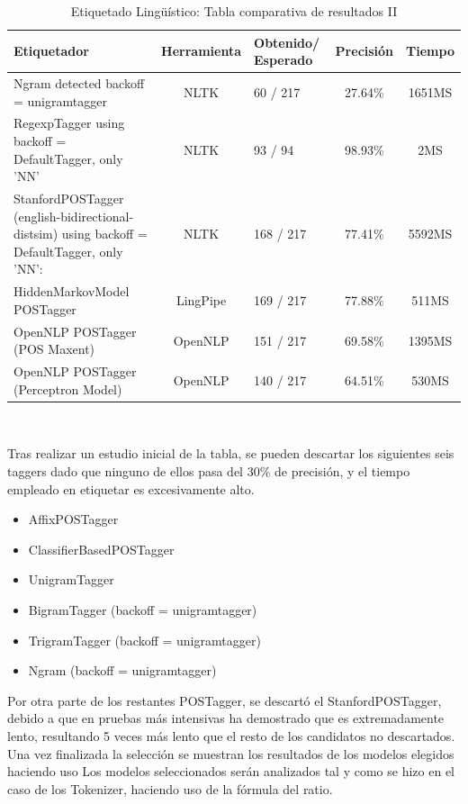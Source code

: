 \documentclass[runningheads,a4paper]{llncs}
\theoremstyle{break}
\newcommand{\rowstyle}[1]{\gdef\currentrowstyle{#1}%
  #1\ignorespaces
}
\begin{document}
\bgroup
\setlength{\tabcolsep}{10pt}
\def\arraystretch{1.5}
\begin{table}
\begin{tabular}{p{4cm}|c|p{2.5cm}|c|c}
\rowstyle{\bfseries} Etiquetador &  \rowstyle{\bfseries} Herramienta & \rowstyle{\bfseries} Obtenido/ \newline Esperado & \rowstyle{\bfseries} Precisión & \rowstyle{\bfseries} Tiempo\\ \hline
Ngram detected backoff = unigramtagger & NLTK & 60 / 217 & 27.64\% & 1651MS \\
RegexpTagger using backoff = DefaultTagger, only 'NN'  & NLTK & 93 / 94 & 98.93\% & 2MS \\
StanfordPOSTagger (english-bidirectional-distsim) using backoff = DefaultTagger, only 'NN': & NLTK & 168 / 217 & 77.41\% & 5592MS \\
HiddenMarkovModel POSTagger          & LingPipe & 169 / 217 & 77.88\% & 511MS \\
OpenNLP POSTagger (POS Maxent)       & OpenNLP  & 151 / 217 & 69.58\% & 1395MS \\
OpenNLP POSTagger (Perceptron Model) & OpenNLP  & 140 / 217 & 64.51\% & 530MS \\ \hline
\end{tabular}
\textbf{}\\
\caption{Etiquetado Lingüístico: Tabla comparativa de resultados II}
\end{table}
\egroup


Tras realizar un estudio inicial de la tabla, se pueden descartar los siguientes seis taggers dado que ninguno de ellos pasa del 30\% de precisión, y el tiempo empleado en etiquetar es excesivamente alto. 

\begin{itemize}
  \item AffixPOSTagger
  \item ClassifierBasedPOSTagger
  \item UnigramTagger
  \item BigramTagger (backoff = unigramtagger)
  \item TrigramTagger (backoff = unigramtagger)
  \item Ngram (backoff = unigramtagger)
\end{itemize}


Por otra parte de los restantes POSTagger, se descartó el StanfordPOSTagger, debido a que en pruebas más intensivas ha demostrado que es extremadamente lento, resultando 5 veces más lento que el resto de los candidatos no descartados. Una vez finalizada la selección se muestran los resultados de los modelos elegidos haciendo uso Los modelos seleccionados serán analizados tal y como se hizo en el caso de los Tokenizer, haciendo uso de la fórmula del ratio. 
\end{document}
